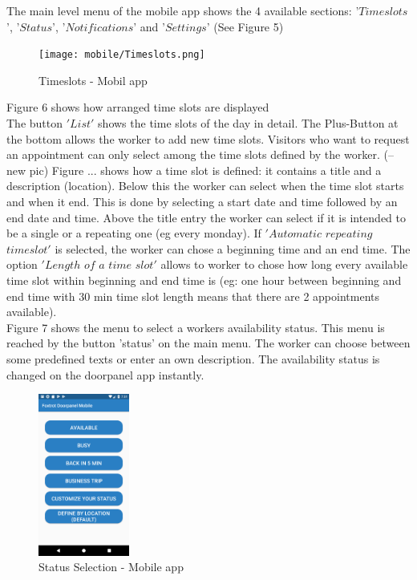 \documentclass[article,colorback,accentcolor=tud4c, 11pt]{tudreport}
\begin{document}
The main level menu of the mobile app shows the 4 available sections: '$Timeslots$', '$Status$', '$Notifications$' and '$Settings$' (See Figure 5)


	\begin{figure}
		\centering
		\texttt{[image: mobile/Timeslots.png]}
		\caption{Timeslots - Mobil app}
	\end{figure}
	
Figure 6 shows how arranged time slots are displayed\\
	
The button $'List'$ shows the time slots of the day in detail. The Plus-Button at the bottom allows the worker to add new time slots. Visitors who want to request an appointment can only select among the time slots defined by the worker. (--new pic) Figure ... shows how a time slot is defined: it contains a title and a description (location). Below this the worker can select when the time slot starts and when it end. This is done by selecting a start date and time followed by an end date and time. Above the title entry the worker can select if it is intended to be a single or a repeating one (eg every monday). If $'Automatic$ $repeating$ $timeslot'$ is selected, the worker can chose a beginning time and an end time. The option $'Length$ $of$ $a$ $time$ $slot'$ allows to worker to chose how long every available time slot within beginning and end time is (eg: one hour between beginning and end time with 30 min time slot length means that there are 2 appointments available).\\

Figure 7 shows the menu to select a workers availability status. This menu is reached by the button 'status' on the main menu. The worker can choose between some predefined texts or enter an own description. The availability status is changed on the doorpanel app instantly.\\
 
	\begin{figure}
		\centering
		\includegraphics[width=30mm,scale=0.8]{mobile/Status-selection.png}
		\caption{Status Selection - Mobile app}
	\end{figure}
	
\end{document}
